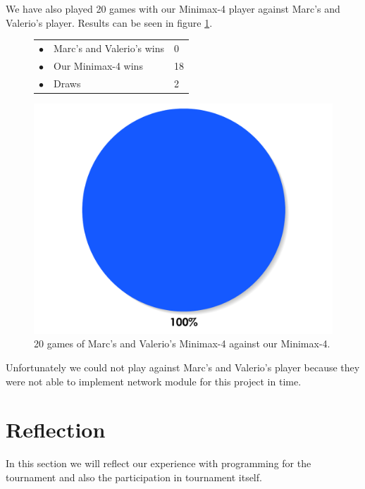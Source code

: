 \documentclass[paper=a4, fontsize=11pt]{article} %
\newcommand{\ra}[1]{\renewcommand{\arraystretch}{#1}}
\begin{document}
We have also played 20 games with our Minimax-4 player against Marc's and Valerio's player.
Results can be seen in figure \ref{fig:tournament2}.
\begin{figure}[ht]
    \begin{minipage}[c]{0.40\linewidth}
        \centering
        \ra{1.3}
        \begin{tabular}{cll}
            \toprule
            \textcolor{red!100}{$\bullet$} & Marc's and Valerio's wins & 0       \\
            \textcolor{blue!100!yellow!100!red!80}{$\bullet$} & Our Minimax-4  wins & 18      \\  
            \textcolor{gray!100}{$\bullet$} & Draws & 2      \\  
            \bottomrule
        \end{tabular}
    \end{minipage}
    \begin{minipage}[c]{0.60\linewidth}
        \centering
        \includegraphics[scale=0.35]{img/tournament2.pdf}
    \end{minipage}
    \caption{20 games of Marc's and Valerio's Minimax-4 against our Minimax-4.}
    \label{fig:tournament2}
\end{figure}


Unfortunately we could not play against Marc's and Valerio's player because they were not able to implement network module for this project in time.


\section{Reflection}
In this section we will reflect our experience with programming for the tournament and also the participation in tournament itself.
\end{document}
